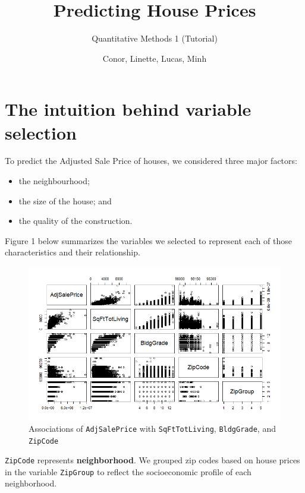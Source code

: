 \documentclass[12pt,a4paper]{article}
\title{Predicting House Prices}
\date{Conor, Linette, Lucas, Minh}
\author{Quantitative Methods 1 (Tutorial)}
\begin{document}
\maketitle

\section{The intuition behind variable selection}

	\noindent To predict the Adjusted Sale Price of houses, we considered three major factors:
	
	\begin{itemize}
		\item the neighbourhood;
		\item the size of the house; and
		\item the quality of the construction. \\
	\end{itemize}
	
	\noindent Figure 1 below summarizes the variables we selected to represent each of those characteristics and their relationship.
	
		 	
	
	\begin{figure}[H]
		\centering
		\includegraphics[width=1\linewidth]{AdjSalePrice_pairs}
		\caption{Associations of \texttt{AdjSalePrice} with \texttt{SqFtTotLiving}, \texttt{BldgGrade}, and \texttt{ZipCode}}
		\label{fig:adjsalepricepairs}
	\end{figure}
		
	\noindent \texttt{ZipCode} represents \textbf{neighborhood}. We grouped zip codes based on house prices in the variable \texttt{ZipGroup} to reflect the socioeconomic profile of each neighborhood. \\
	
\end{document}

